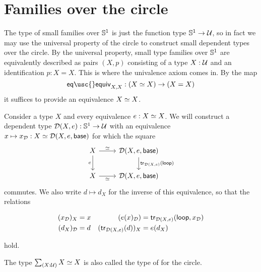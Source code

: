 \section{Families over the circle}

The type of small families over $\mathbb{S}^{1}$ is just the function type $\mathbb{S}^{1}\to\mathcal{U}$, so in fact we may use the universal property of the circle to construct small dependent types over the circle. 
By the universal property, small type families over $\mathbb{S}^{1}$ are equivalently described as pairs $(X,p)$ consisting of a type $X:\mathcal{U}$ and an identification $p:X=X$.
This is where the univalence axiom comes in. By the map
\begin{equation*}
\mathsf{eq\usc{}equiv}_{X,X}:(\eqv{X}{X})\to (X=X)
\end{equation*}
it suffices to provide an equivalence $\eqv{X}{X}$.

\begin{defn}\label{defn:circle_descent}
Consider a type $X$ and every equivalence $e:\eqv{X}{X}$.
We will construct a dependent type $\mathcal{D}(X,e):\mathbb{S}^{1}\to\mathcal{U}$ with an equivalence $x\mapsto x_{\mathcal{D}}:\eqv{X}{\mathcal{D}(X,e,\base)}$ for which the square
\begin{equation*}
\begin{tikzcd}
X \arrow[r,"\eqvsym"] \arrow[d,swap,"e"] & \mathcal{D}(X,e,\base) \arrow[d,"\mathsf{tr}_{\mathcal{D}(X,e)}(\lloop)"] \\
X \arrow[r,swap,"\eqvsym"] & \mathcal{D}(X,e,\base)
\end{tikzcd}
\end{equation*}
commutes. We also write $d\mapsto d_{X}$ for the inverse of this equivalence, so that the relations
\begin{samepage}%
\begin{align*}
(x_{\mathcal{D}})_X & =x & (e(x)_{\mathcal{D}}) & = \mathsf{tr}_{\mathcal{D}(X,e)}(\mathsf{loop},x_{\mathcal{D}}) \\
(d_X)_{\mathcal{D}} & =d & (\mathsf{tr}_{\mathcal{D}(X,e)}(d))_X & = e(d_X)
\end{align*}
\end{samepage}%
hold.

The type $\sm{X:\UU}\eqv{X}{X}$ is also called the type of  for the circle.
\end{defn}

